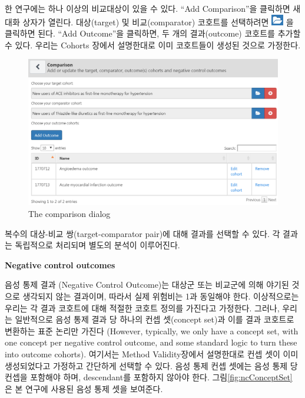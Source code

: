 \documentclass[]{book}
\begin{document}
한 연구에는 하나 이상의 비교대상이 있을 수 있다. ``Add Comparison''을 클릭하면 새 대화 상자가 열린다. 대상(target) 및 비교(comparator) 코호트를 선택하려면 \includegraphics{images/PopulationLevelEstimation/open.png} 을 클릭하면 된다. ``Add Outcome''을 클릭하면, 두 개의 결과(outcome) 코호트를 추가할 수 있다. 우리는 Cohorts 장에서 설명한대로 이미 코호트들이 생성된 것으로 가정한다.

\begin{figure}

{\centering \includegraphics[width=1\linewidth]{images/PopulationLevelEstimation/comparisons} 

}

\caption{The comparison dialog}\label{fig:comparisons}
\end{figure}

복수의 대상-비교 쌍(target-comparator pair)에 대해 결과를 선택할 수 있다. 각 결과는 독립적으로 처리되며 별도의 분석이 이루어진다.

\textbf{Negative control outcomes}

음성 통제 결과 (Negative Control Outcome)는 대상군 또는 비교군에 의해 야기된 것으로 생각되지 않는 결과이며, 따라서 실제 위험비는 1과 동일해야 한다. 이상적으로는 우리는 각 결과 코호트에 대해 적절한 코호트 정의를 가진다고 가정한다. 그러나, 우리는 일반적으로 음성 통제 결과 당 하나의 컨셉 셋(concept set)과 이를 결과 코호트로 변환하는 표준 논리만 가진다 (However, typically, we only have a concept set, with one concept per negative control outcome, and some standard logic to turn these into outcome cohorts). 여기서는 Method Validity장에서 설명한대로 컨셉 셋이 이미 생성되었다고 가정하고 간단하게 선택할 수 있다. 음성 통제 컨셉 셋에는 음성 통제 당 컨셉을 포함해야 하며, descendant를 포함하지 않아야 한다. 그림\ref{fig:ncConceptSet} 은 본 연구에 사용된 음성 통제 셋을 보여준다.
\end{document}
